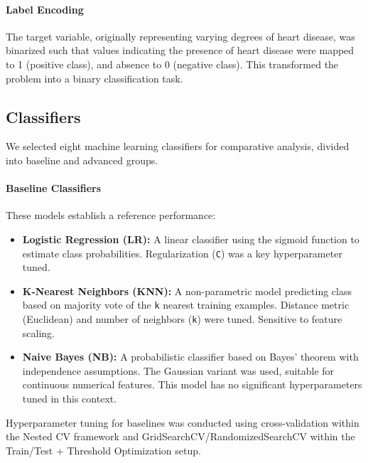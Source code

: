 \documentclass{article}
\begin{document}
\paragraph{Label Encoding}
The target variable, originally representing varying degrees of heart disease, was binarized such that values indicating the presence of heart disease were mapped to 1 (positive class), and absence to 0 (negative class). This transformed the problem into a binary classification task.

\subsection{Classifiers}
\label{sec:classifiers} %

We selected eight machine learning classifiers for comparative analysis, divided into baseline and advanced groups.

\paragraph{Baseline Classifiers}
These models establish a reference performance:
\begin{itemize}
    \item \textbf{Logistic Regression (LR):} A linear classifier using the sigmoid function to estimate class probabilities. Regularization (\texttt{C}) was a key hyperparameter tuned.
    \item \textbf{K-Nearest Neighbors (KNN):} A non-parametric model predicting class based on majority vote of the \texttt{k} nearest training examples. Distance metric (Euclidean) and number of neighbors (\texttt{k}) were tuned. Sensitive to feature scaling.
    \item \textbf{Naive Bayes (NB):} A probabilistic classifier based on Bayes’ theorem with independence assumptions. The Gaussian variant was used, suitable for continuous numerical features. This model has no significant hyperparameters tuned in this context.
\end{itemize}
Hyperparameter tuning for baselines was conducted using cross-validation within the Nested CV framework and GridSearchCV/RandomizedSearchCV within the Train/Test + Threshold Optimization setup.
\end{document}
